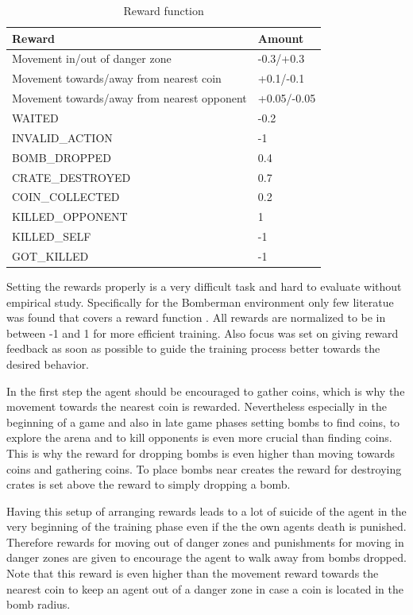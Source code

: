 \begin{table}[hbt!]
	\caption{Reward function}
	\label{tab:rewards}
	\begin{tabular}{|p{}|p{}|}
		\hline
		\textbf{Reward} & \textbf{Amount} \\ \hline
		Movement in/out of danger zone & -0.3/+0.3 \\ \hline
		Movement towards/away from nearest coin & +0.1/-0.1 \\ \hline
		Movement towards/away from nearest opponent & +0.05/-0.05 \\ \hline
		WAITED & -0.2 \\ \hline
		INVALID\_ACTION & -1 \\ \hline
		BOMB\_DROPPED & 0.4 \\ \hline
		CRATE\_DESTROYED & 0.7 \\ \hline
		COIN\_COLLECTED & 0.2 \\ \hline
		KILLED\_OPPONENT & 1 \\ \hline
		KILLED\_SELF & -1 \\ \hline
		GOT\_KILLED & -1 \\ \hline
	\end{tabular}
\end{table}

Setting the rewards properly is a very difficult task and hard to evaluate without empirical study. Specifically for the Bomberman environment only few literatue was found that covers a reward function \cite{Kormelink2018, Franca2019}. All rewards are normalized to be in between -1 and 1 for more efficient training. Also focus was set on giving reward feedback as soon as possible to guide the training process better towards the desired behavior. 

In the first step the agent should be encouraged to gather coins, which is why the movement towards the nearest coin is rewarded. Nevertheless especially in the beginning of a game and also in late game phases setting bombs to find coins, to explore the arena and to kill opponents is even more crucial than finding coins. This is why the reward for dropping bombs is even higher than moving towards coins and gathering coins. To place bombs near creates the reward for destroying crates is set above the reward to simply dropping a bomb. 

Having this setup of arranging rewards leads to a lot of suicide of the agent in the very beginning of the training phase even if the the own agents death is punished. Therefore rewards for moving out of danger zones and punishments for moving in danger zones are given to encourage the agent to walk away from bombs dropped. Note that this reward is even higher than the movement reward towards the nearest coin to keep an agent out of a danger zone in case a coin is located in the bomb radius. 


